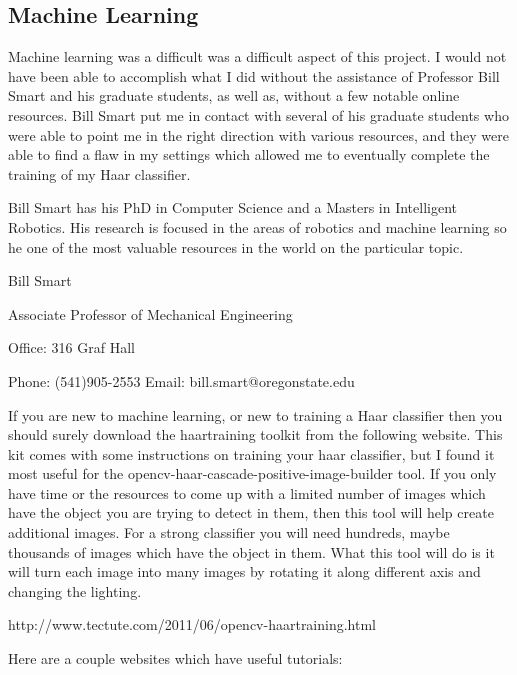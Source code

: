 \documentclass[10pt,letterpaper,onecolumn,draftclsnofoot,journal]{IEEEtran}
\begin{document}
\subsection{\textbf{Machine Learning}}
Machine learning was a difficult was a difficult aspect of this project. I would not have been able to accomplish what I did without the assistance of Professor Bill Smart and his graduate students, as well as, without a few notable online resources. Bill Smart put me in contact with several of his graduate students who were able to point me in the right direction with various resources, and they were able to find a flaw in my settings which allowed me to eventually complete the training of my Haar classifier.\vspace{.3cm}
\par
Bill Smart has his PhD in Computer Science and a Masters in Intelligent Robotics. His research is focused in the areas of robotics and machine learning so he one of the most valuable resources in the world on the particular topic.\vspace{.3cm}
\par
Bill Smart\par
Associate Professor of Mechanical Engineering\par
Office: 316 Graf Hall\par
Phone: (541)905-2553
Email: bill.smart@oregonstate.edu\vspace{.3cm}
\par
If you are new to machine learning, or new to training a Haar classifier then you should surely download the haartraining toolkit from the following website. This kit comes with some instructions on training your haar classifier, but I found it most useful for the opencv-haar-cascade-positive-image-builder tool. If you only have time or the resources to come up with a limited number of images which have the object you are trying to detect in them, then this tool will help create additional images. For a strong classifier you will need hundreds, maybe thousands of images which have the object in them. What this tool will do is it will turn each image into many images by rotating it along different axis and changing the lighting.\vspace{.3cm}
\par 
 http://www.tectute.com/2011/06/opencv-haartraining.html\vspace{.3cm}
\par
Here are a couple websites which have useful tutorials:\vspace{.3cm}
\end{document}
